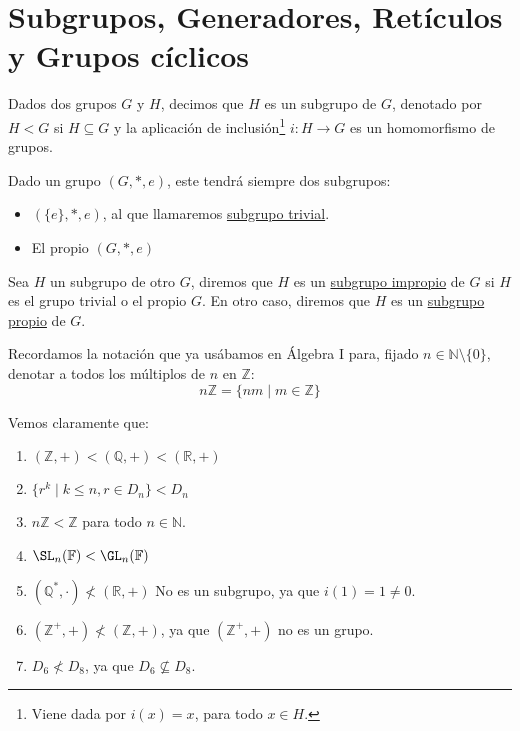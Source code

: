 \chapter{Subgrupos, Generadores, Retículos y Grupos cíclicos}
\begin{definicion}[Subgrupo]
    Dados dos grupos $G$ y $H$, decimos que $H$ es un subgrupo de $G$, denotado por $H < G$ si $H\subseteq G$ y la aplicación de inclusión\footnote{Viene dada por $i(x) = x$, para todo $x\in H$.} $i:H\to G$ es un homomorfismo de grupos.
\end{definicion}

\begin{observacion}
    Dado un grupo $(G,\ast,e)$, este tendrá siempre dos subgrupos:
    \begin{itemize}
        \item $(\{e\},\ast,e)$, al que llamaremos \underline{subgrupo trivial}.
        \item El propio $(G, \ast, e)$
    \end{itemize}
\end{observacion}

\begin{definicion}
    Sea $H$ un subgrupo de otro $G$, diremos que $H$ es un \underline{subgrupo impropio} de $G$ si $H$ es el grupo trivial o el propio $G$. En otro caso, diremos que $H$ es un \underline{subgrupo propio} de $G$.
\end{definicion}

\begin{notacion}
    Recordamos la notación que ya usábamos en Álgebra I para, fijado $n\in \mathbb{N}\setminus\{0\}$, denotar a todos los múltiplos de $n$ en $\mathbb{Z}$:
    \begin{equation*}
        n\mathbb{Z} = \{nm \mid m\in \mathbb{Z}\}
    \end{equation*}
\end{notacion}

\begin{ejemplo}
    Vemos claramente que:
    \begin{enumerate}
        \item $(\mathbb{Z},+) < (\mathbb{Q},+) < (\mathbb{R}, +)$
        \item $\{r^k \mid k\leq n, r\in D_n\} < D_n$ 
        \item $n\mathbb{Z} < \mathbb{Z}$ para todo $n\in \mathbb{N}$.
        \item $\SL_n(\mathbb{F}) < \GL_n(\mathbb{F})$
        \item $(\mathbb{Q}^\ast, \cdot) \not< (\mathbb{R}, +)$ No es un subgrupo, ya que $i(1) = 1 \neq 0$.
        \item $(\mathbb{Z}^+, +) \not< (\mathbb{Z}, +)$, ya que $(\mathbb{Z}^+, +)$ no es un grupo.
        \item $D_6 \not< D_8$, ya que $D_6\nsubseteq D_8$.
    \end{enumerate}
\end{ejemplo}

